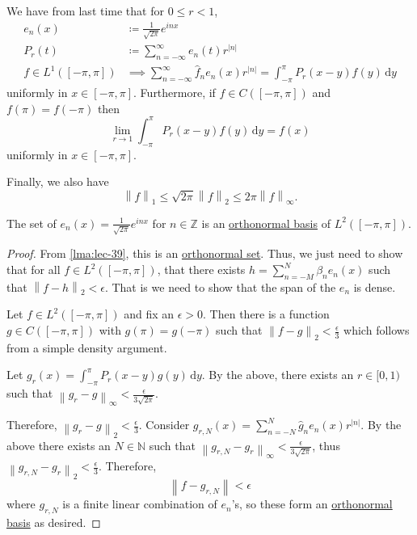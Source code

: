 \begin{prev}
	We have from last time that for \(0 \leq r < 1\),
	\[
		\begin{split}
			e_n(x)                & \coloneqq \frac{1}{\sqrt{2\pi} }e^{inx}                                                                                    \\
			P_r(t)                & \coloneqq \sum_{n=-\infty}^\infty e_n(t)r^{\left\vert n \right\vert }                                                      \\
			f \in L^1([-\pi,\pi]) & \implies \sum_{n=-\infty}^\infty \hat{f}_ne_n(x)r^{\left\vert n \right\vert } = \int_{-\pi}^\pi P_r(x-y)f(y) \,\mathrm{d}y
		\end{split}
	\]
	uniformly in \(x \in [-\pi,\pi]\). Furthermore, if \(f \in C([-\pi,\pi])\) and \(f(\pi) = f(-\pi)\) then
	\[
		\lim_{r \to 1} \int_{-\pi}^\pi P_r(x-y)f(y) \,\mathrm{d}y = f(x)
	\]
	uniformly in \(x \in [-\pi,\pi]\).

	Finally, we also have
	\[
		\left\lVert f\right\rVert_1 \leq \sqrt{2\pi} \left\lVert f\right\rVert_2 \leq 2\pi \left\lVert f\right\rVert_\infty.
	\]
\end{prev}

\begin{theorem}\label{thm:fourier-series}
	The set of \(e_n(x) = \frac{1}{\sqrt{2\pi} }e^{inx}\) for \(n \in \mathbb{Z} \) is an
	\hyperref[def:orthonormal-basis]{orthonormal basis} of \(L^2([-\pi,\pi])\).
\end{theorem}
\begin{proof}
	From \autoref{lma:lec-39}, this is an \hyperref[def:orthonormal-set]{orthonormal set}. Thus, we just need to show that for
	all \(f \in L^2([-\pi,\pi])\), that there exists \(h = \sum_{n=-M}^N \beta_n e_n(x)\) such that
	\(\left\lVert f-h\right\rVert _2 < \epsilon \). That is we need to show that the span of the \(e_n\) is dense.

	Let \(f \in L^2([-\pi,\pi])\) and fix an \(\epsilon > 0\). Then there is a function \(g \in C([-\pi,\pi])\) with \(g(\pi) = g(-\pi)\)
	such that \(\left\lVert f-g\right\rVert_2 < \frac{\epsilon}{3}\) which follows from a simple density argument.

	Let \(g_r(x) = \int_{-\pi}^\pi P_r(x-y)g(y) \,\mathrm{d}y\). By the above, there exists an \(r \in [0,1)\) such that
	\(\left\lVert g_r - g\right\rVert_\infty < \frac{\epsilon }{3\sqrt{2\pi}}\).

	Therefore, \(\left\lVert g_r - g\right\rVert_2 < \frac{\epsilon }{3}\). Consider
	\(g_{r,N}(x) = \sum_{n=-N}^N \hat{g} _n e_n(x)r^{\left\vert n \right\vert }\). By the above there exists an
	\(N \in \mathbb{N} \) such that \(\left\lVert g_{r,N} - g_r\right\rVert _\infty < \frac{\epsilon }{3\sqrt{2\pi}}\),
	thus \(\left\lVert g_{r,N} - g_r\right\rVert_2 < \frac{\epsilon}{3}\). Therefore,
	\[
		\left\lVert f - g_{r,N}\right\rVert < \epsilon
	\]
	where \(g_{r,N}\) is a finite linear combination of \(e_n\)'s, so these form an \hyperref[def:orthonormal-basis]{orthonormal basis}
	as desired.
\end{proof}

